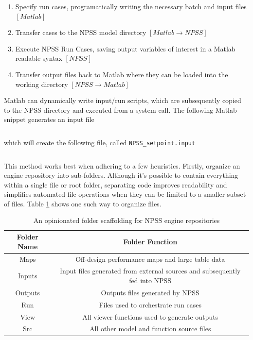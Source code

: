 \documentclass[heading.tex]{subfiles}
\begin{document}
\begin{enumerate}
  \item Specify run cases, programatically writing the necessary batch and input files $[Matlab]$
  \item Transfer cases to the NPSS model directory $[Matlab \rightarrow NPSS]$
  \item Execute NPSS Run Cases, saving output variables of interest in a Matlab readable syntax $[NPSS]$
  \item Transfer output files back to Matlab where they can be loaded into the working directory $[NPSS \rightarrow Matlab]$
\end{enumerate}


Matlab can dynamically write input/run scripts, which are subsequently
copied to the NPSS directory and executed from a system call.
The following Matlab snippet generates an input file

 \begin{adjustwidth}{-1cm}{-1cm}
 \inputminted[]{matlab}{code/dlmwrite.m}
 \end{adjustwidth} 

which will create the following file, called \texttt{NPSS\_setpoint.input}

 \begin{adjustwidth}{-1cm}{-1cm}
 \inputminted[]{matlab}{code/dlmOutput.m}
 \end{adjustwidth} 


This method works best when adhering to a few heuristics. Firstly, organize an engine repository
into sub-folders. Although it's possible to contain everything within a single file or root folder, separating code
improves readability and simplifies automated file operations when they can be limited to a smaller subset of files.
Table \ref{tab:Scaffolding} shows one such way to organize files.

\begin{table}[H]
\centering
\begin{tabular}{|c|c|}
\hline 
Folder Name & Folder Function \\ 
\hline \hline
Maps & Off-design performance maps and large table data \\ 
\hline 
Inputs & Input files generated from external sources and subsequently fed into NPSS \\ 
\hline 
Outputs & Outputs files generated by NPSS \\ 
\hline 
Run & Files used to orchestrate run cases \\ 
\hline 
View & All viewer functions used to generate outputs \\ 
\hline 
Src & All other model and function source files \\ 
\hline 
\end{tabular} 
\caption{An opinionated folder scaffolding for NPSS engine repositories}
\label{tab:Scaffolding}
\end{table}
\end{document}
